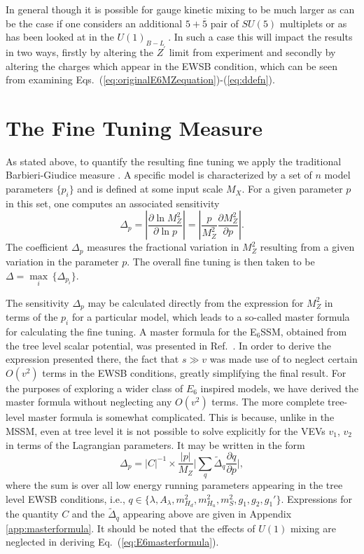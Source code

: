 \documentclass[preprint,amsmath,amssymb,aps,superscriptaddress,prd,
showpacs,floatfix,nofootinbib]{revtex4-1}
\newcommand{\be}{\begin{equation}}
\newcommand{\ee}{\end{equation}}
\begin{document}
In general though it is possible for gauge kinetic mixing to be much larger
as can be the case if one considers an additional $5 + \overline{5}$ pair of
$SU(5)$ multiplets \cite{Rizzo:1998ut} or as has been looked at in the
$U(1)_{B-L}$ \cite{Salvioni:2009mt,Krauss:2012ku}.  In such a case this will
impact the results in two ways, firstly by altering the $Z^\prime$ limit from
experiment and secondly by altering the charges which appear in the EWSB
condition, which can be seen from examining
Eqs.~(\ref{eq:originalE6MZequation})-(\ref{eq:ddefn}).

\section{\label{sec:tuningmeasure}The Fine Tuning
Measure}

As stated above, to quantify the resulting fine tuning we apply the
traditional Barbieri-Giudice measure \cite{Ellis:1986yg, Barbieri:1987fn}.
A specific model is characterized by a set of $n$ model parameters $\{p_i\}$
and is defined at some input scale $M_X$. For a given parameter $p$ in this
set, one computes an associated sensitivity
\begin{equation} \label{eq:bgmeasure}
\Delta_p = \left | \frac{\partial \ln M_Z^2}{\partial \ln p} \right
| = \left | \frac{p}{M_Z^2} \frac{\partial M_Z^2}{\partial p} \right | .
\end{equation}
The coefficient $\Delta_p$ measures the fractional variation in $M_Z^2$
resulting from a given variation in the parameter $p$.  The overall fine
tuning is then taken to be
$\Delta = \underset{i}{\max} \, \{ \Delta_{p_i} \}$.

The sensitivity $\Delta_p$ may be calculated directly from the expression
for $M_Z^2$ in terms of the $p_i$ for a particular model, which leads to a
so-called master formula for calculating the fine tuning.  A master formula
for the E$_6$SSM, obtained from the tree level scalar potential, was
presented in Ref.~\cite{Athron:2013ipa}.  In order to derive the expression
presented there, the fact that $s \gg v$ was made use of to neglect certain
$O(v^2)$ terms in the EWSB conditions, greatly simplifying the final result.
For the purposes of exploring a wider class of $E_6$ inspired models, we have
derived the master formula without neglecting any $O(v^2)$ terms.  The more
complete tree-level master formula is somewhat complicated.  This is
because, unlike in the MSSM, even at tree level it is not possible to
solve explicitly for the VEVs $v_1$, $v_2$ in terms of the Lagrangian
parameters.  It may be written in the form \be \Delta_p = |C|^{-1} \times
\frac{|p|}{M_Z} \bigg | \sum_{q} \tilde{\Delta}_q \frac{\partial q}
{\partial p} \bigg | , \label{eq:E6masterformula}
\ee where the sum is over all low energy running parameters appearing
in the tree level EWSB conditions, i.e., $q \in \{\lambda , A_\lambda ,
m_{H_d}^2 , m_{H_u}^2 , m_S^2 , g_1 , g_2 , g_1'\}$.  Expressions for the
quantity $C$ and the $\tilde{\Delta}_q$ appearing above are given in
Appendix \ref{app:masterformula}.  It should be noted that the effects
of $U(1)$ mixing are neglected in deriving Eq.~(\ref{eq:E6masterformula}).
\end{document}
